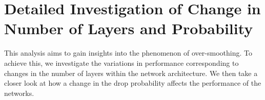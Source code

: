 \newcommand*{\addstd}[4]{
    \addplot[name path=#3upper, draw=none] table[x=#2, y expr=\thisrow{#3Avg}+\thisrow{#3Std}, col sep=semicolon] {#1};
    \addplot[name path=#3lower, draw=none] table[x=#2, y expr=\thisrow{#3Avg}-\thisrow{#3Std}, col sep=semicolon] {#1};
    \addplot[fill=#4, fill opacity=0.1] fill between[of=#3upper and #3lower];
}
\newcommand*{\layerplot}[6]{\begin{tikzpicture}
        \begin{axis}[
                width=0.8\linewidth,
                height=6cm,
                xlabel={#3},
                ylabel={#4},
                xtick={#5}, %
                ytick distance={#6}, %
                legend pos=outer north east,
                legend style={nodes={scale=0.6, transform shape}},
                grid=major,
            ]

            \addplot[color= p_red] table [x=#2, y=noneAvg, col sep=semicolon] {#1};
            \addlegendentry{No Regularization}

            \addplot[color= p_green] table [x=#2, y=dropoutAvg, col sep=semicolon] {#1};
            \addlegendentry{Dropout}

            \addplot[color= p_blue] table [x=#2, y=nodesamplingAvg, col sep=semicolon] {#1};
            \addlegendentry{Node Sampling}

            \addplot[color= p_yellow] table [x=#2, y=dropedgeAvg, col sep=semicolon] {#1};
            \addlegendentry{DropEdge}

            \addplot[color= p_violet] table [x=#2, y=gdcAvg, col sep=semicolon] {#1};
            \addlegendentry{GDC}

            \addstd{#1}{#2}{none}{p_red}
            \addstd{#1}{#2}{dropout}{p_green}
            \addstd{#1}{#2}{nodesampling}{p_blue}
            \addstd{#1}{#2}{dropedge}{p_yellow}
            \addstd{#1}{#2}{gdc}{p_violet}
        \end{axis}
    \end{tikzpicture}}


\section{Detailed Investigation of Change in Number of Layers and Probability}
This analysis aims to gain insights into the phenomenon of over-smoothing. To achieve this, we investigate the variations in performance corresponding to changes in the number of layers within the network architecture.
We then take a closer look at how a change in the drop probability affects the performance of the networks.

